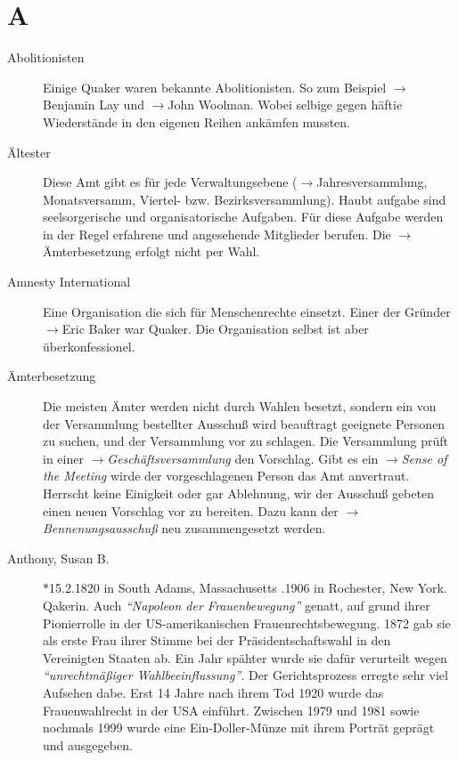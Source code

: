 \section*{A}

\articlesize
\begin{description}

 \item[Abolitionisten] Einige Quaker waren bekannte Abolitionisten. So zum Beispiel $\to$Benjamin Lay und $\to$John Woolman. Wobei selbige gegen häftie Wiederstände in den eigenen Reihen ankämfen mussten.

 \item[Ältester] Diese Amt gibt es für jede Verwaltungsebene ($\to$Jahresversammlung, Monatsversamm, Viertel- bzw. Bezirksversammlung). Haubt aufgabe sind seelsorgerische und organisatorische Aufgaben. Für diese Aufgabe werden in der Regel erfahrene und angesehende Mitglieder berufen. Die $\to$Ämterbesetzung erfolgt nicht per Wahl.

 \item[Amnesty International] Eine Organisation die sich für Menschenrechte einsetzt. Einer der Gründer $\to$Eric Baker war Quaker. Die Organisation selbst ist aber überkonfessionel.

 \item[Ämterbesetzung]  Die meisten Ämter werden nicht durch Wahlen besetzt, sondern ein von der Versammlung bestellter Ausschuß wird beauftragt geeignete Personen zu suchen, und der Versammlung vor zu schlagen. Die Versammlung prüft in einer $\to$\textit{Geschäftsversammlung} den Vorschlag. Gibt es ein $\to$\textit{Sense of the Meeting} wirde der vorgeschlagenen Person das Amt anvertraut. Herrscht keine Einigkeit oder gar Ablehnung, wir der Ausschuß gebeten einen neuen Vorschlag vor zu bereiten. Dazu kann der $\to$\textit{Bennenungsausschuß} neu zusammengesetzt werden.

 \item[Anthony, Susan B.] $\ast$15.2.1820 in South Adams, Massachusetts .1906 in Rochester, New York. Qakerin. Auch \textit{"`Napoleon der Frauenbewegung"'} genatt, auf grund ihrer Pionierrolle in der US-amerikanischen Frauenrechtsbewegung. 1872 gab sie als erste Frau ihrer Stimme bei der Präsidentschaftswahl in den Vereinigten Staaten ab. Ein Jahr spähter wurde sie dafür verurteilt wegen \textit{"`unrechtmäßiger Wahlbeeinflussung"'}. Der Gerichtsprozess erregte sehr viel Aufsehen dabe. Erst 14 Jahre nach ihrem Tod 1920 wurde das Frauenwahlrecht in der USA einführt. Zwischen 1979 und 1981 sowie nochmals 1999 wurde eine Ein-Doller-Münze mit ihrem Porträt geprägt und ausgegeben.


\end{description}

